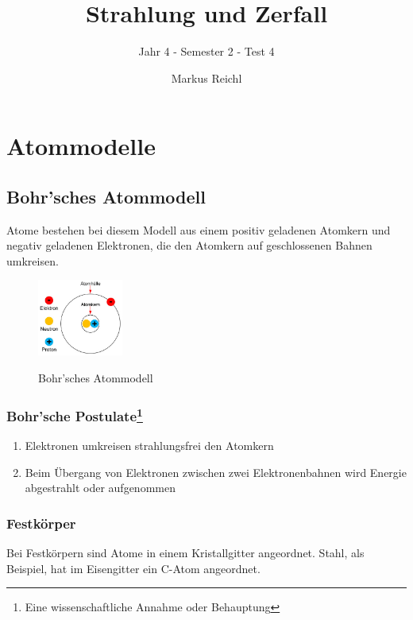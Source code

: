 \documentclass{school}
\title{Strahlung und Zerfall}
\subtitle{Jahr 4 \-- Semester 2 \-- Test 4}
\author{Markus Reichl}
\begin{document}
\maketitle
\tableofcontents
\newpage

\section{Atommodelle}
\subsection{Bohr'sches Atommodell}
Atome bestehen bei diesem Modell aus einem positiv geladenen Atomkern und negativ geladenen Elektronen, die den Atomkern auf geschlossenen Bahnen umkreisen.\cite{wikipedia-bohr}

\begin{figure}[!ht]
\centering
\includegraphics[width=0.25\textwidth]{einfaches-atommodell-a3.jpg}\\
\caption[https://www.sps-lehrgang.de/atommodelle/]{Bohr'sches Atommodell}
\end{figure}

\subsubsection[Bohr'sche Postulate]{Bohr'sche Postulate\protect\footnote{Eine wissenschaftliche Annahme oder Behauptung}}
\begin{enumerate}
    \item Elektronen umkreisen strahlungsfrei den Atomkern
    \item Beim Übergang von Elektronen zwischen zwei Elektronenbahnen wird Energie abgestrahlt oder aufgenommen
\end{enumerate}

\subsubsection{Festkörper}
Bei Festkörpern sind Atome in einem Kristallgitter angeordnet.
Stahl, als Beispiel, hat im Eisengitter ein C-Atom angeordnet.
\end{document}
